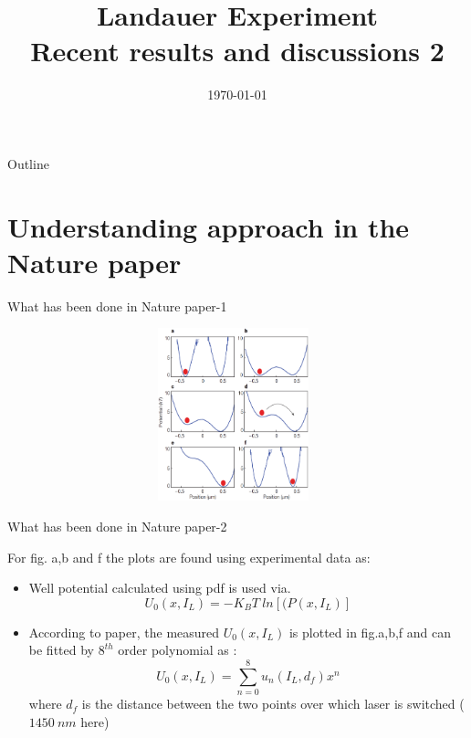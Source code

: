 \documentclass{beamer}
\title[Recent results and discussions] %
{Landauer Experiment \\Recent results and discussions 2}
\institute[U of M] %
{
 Department of Electrical Engineering\\
 University of Minnesota\\
}
\date{\today}
\begin{document}
\begin{frame}
  \titlepage
\end{frame}

\begin{frame}{Outline}
  \tableofcontents  %
\end{frame}



\section{Understanding approach in the Nature paper}
\begin{frame}{What has been done in Nature paper-1} 

\begin{figure}
    \centering
    \includegraphics[height=5cm,width=11cm]{nature_landauer_fig1.eps}
    \label{fig:graph26}
\end{figure}

\end{frame}
\begin{frame}{What has been done in Nature paper-2} 

For fig. a,b and f the plots are found using experimental data as:
\begin{itemize}

\item Well potential calculated using pdf is used via.
\begin{equation*}
U_0(x,I_L) = -K_BT~ln[(P(x,I_L)]
\end{equation*}
\item According to paper, the measured $U_0(x,I_L)$ is plotted in fig.a,b,f and can be fitted by $8^{th}$ order polynomial as :
\begin{equation*}
U_0(x,I_L) = \sum_{n=0}^8 u_n(I_L,d_f)x^n
\end{equation*}
where $d_f$ is the distance between the two points over which laser is switched ($1450~nm$ here)

\end{itemize}

\end{frame}
\end{document}
